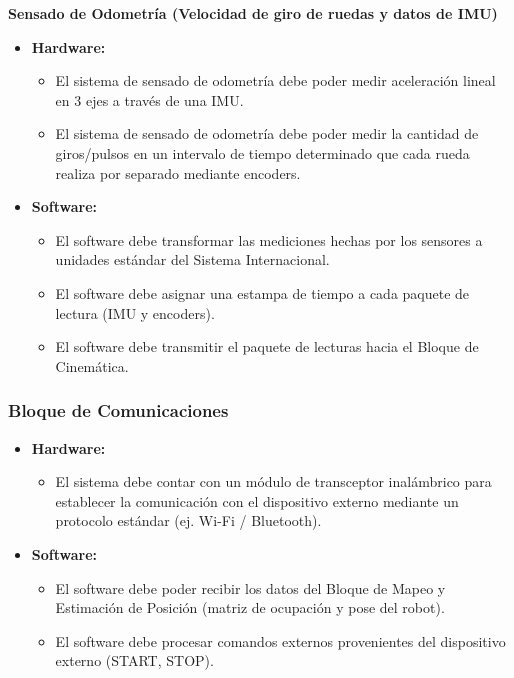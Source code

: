 \noindent\textbf{Sensado de Odometría (Velocidad de giro de ruedas y datos de IMU)}
\begin{itemize}
    \item \textbf{Hardware:}
    \begin{itemize}
        \item El sistema de sensado de odometría debe poder medir aceleración lineal en 3 ejes a través de una IMU.
        \item El sistema de sensado de odometría debe poder medir la cantidad de giros/pulsos en un intervalo de tiempo determinado que cada rueda realiza por separado mediante encoders.
    \end{itemize}
    \item \textbf{Software:}
    \begin{itemize}
        \item El software debe transformar las mediciones hechas por los sensores a unidades estándar del Sistema Internacional.
        \item El software debe asignar una estampa de tiempo a cada paquete de lectura (IMU y encoders).
        \item El software debe transmitir el paquete de lecturas hacia el Bloque de Cinemática.
    \end{itemize}
\end{itemize}

\subsubsection{Bloque de Comunicaciones}
\begin{itemize}
    \item \textbf{Hardware:}
    \begin{itemize}
        \item El sistema debe contar con un módulo de transceptor inalámbrico para establecer la comunicación con el dispositivo externo mediante un protocolo estándar (ej. Wi-Fi / Bluetooth).
    \end{itemize}
    \item \textbf{Software:}
    \begin{itemize}
        \item El software debe poder recibir los datos del Bloque de Mapeo y Estimación de Posición (matriz de ocupación y pose del robot).
        \item El software debe procesar comandos externos provenientes del dispositivo externo (START, STOP).
    \end{itemize}
\end{itemize}

